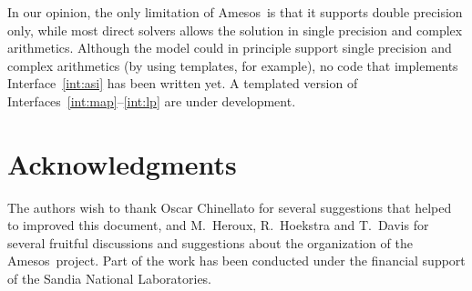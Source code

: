 \documentclass[acmtocl]{acmtrans2m}
\newcommand{\amesos}{{\sc Amesos}}
\begin{document}
In our opinion, the only limitation of \amesos\ is that it supports double
precision only, while most direct solvers allows the solution in single
precision and complex arithmetics.  Although the model could in principle
support single precision and complex arithmetics (by using templates, for
                                                  example), no code that
implements Interface~\ref{int:asi} has been written yet. A templated version
of Interfaces~\ref{int:map}--\ref{int:lp} are under development.

\section*{Acknowledgments}

The authors wish to thank Oscar Chinellato for several suggestions that helped
to improved this document, and M.~Heroux, R.~Hoekstra and T.~Davis for several
fruitful discussions and suggestions about the organization of the \amesos\
project. Part of the work has been conducted under the financial
support of the Sandia National Laboratories.



\end{document}
